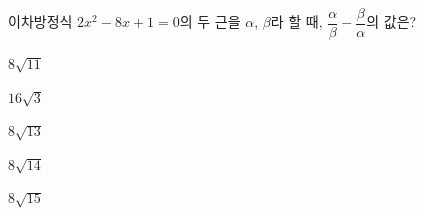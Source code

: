 이차방정식 $2x^2-8x+1=0$의 두 근을 $\alpha$, $\beta$라 할 때, $\dfrac{\alpha}{\beta}-\dfrac{\beta}{\alpha}$의 값은? \cond{$\alpha>\beta$}
\begin{choices32}{\rule[-3ex]{0pt}{8ex}$8\sqrt{11}$}{\rule[-3ex]{0pt}{8ex}$16\sqrt{3}$}{\rule[-3ex]{0pt}{8ex}$8\sqrt{13}$}{\rule[-3ex]{0pt}{8ex}$8\sqrt{14}$}{\rule[-3ex]{0pt}{8ex}$8\sqrt{15}$}\end{choices32}
